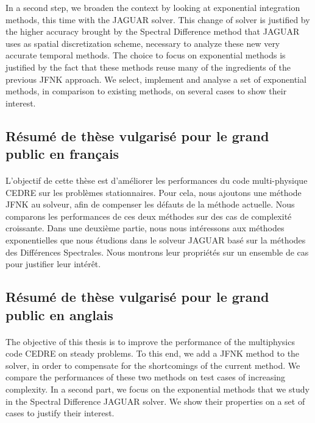 In a second step, we broaden the context by looking at exponential integration methods, this time with the JAGUAR solver.
This change of solver is justified by the higher accuracy brought by the Spectral Difference method that JAGUAR uses as spatial discretization scheme, necessary to analyze these new very accurate temporal methods.
The choice to focus on exponential methods is justified by the fact that these methods reuse many of the ingredients of the previous JFNK approach.
We select, implement and analyse a set of exponential methods, in comparison to existing methods, on several cases to show their interest.


  \subsection{Résumé de thèse vulgarisé pour le grand public en français}

    \paragraph{}
L'objectif de cette thèse est d'améliorer les performances du code multi-physique CEDRE sur les problèmes stationnaires.
Pour cela, nous ajoutons une méthode JFNK au solveur, afin de compenser les défauts de la méthode actuelle.
Nous comparons les performances de ces deux méthodes sur des cas de complexité croissante.
Dans une deuxième partie, nous nous intéressons aux méthodes exponentielles que nous étudions dans le solveur JAGUAR basé sur la méthodes des Différences Spectrales.
Nous montrons leur propriétés sur un ensemble de cas pour justifier leur intérêt.


  \subsection{Résumé de thèse vulgarisé pour le grand public en anglais}

  \paragraph{}
The objective of this thesis is to improve the performance of the multiphysics code CEDRE on steady problems.
To this end, we add a JFNK method to the solver, in order to compensate for the shortcomings of the current method.
We compare the performances of these two methods on test cases of increasing complexity.
In a second part, we focus on the exponential methods that we study in the Spectral Difference JAGUAR solver.
We show their properties on a set of cases to justify their interest.
